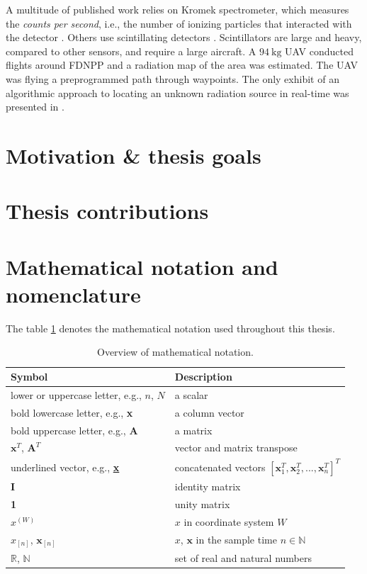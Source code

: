 \documentclass[a4paper,11pt,titlepage,twoside]{book}
\newcommand{\unit}[2]{$#1~\ensuremath{\mathrm{#2}}$}
\begin{document}
A multitude of published work relies on Kromek spectrometer, which measures the \textit{counts per second}, i.e., the number of ionizing particles that interacted with the detector \cite{han2013lowcost, macfarlane2014lightweight, martin20163d, martin2015use}.
Others use scintillating detectors \cite{sanada2015aerial, towler2012radiation}.
Scintillators are large and heavy, compared to other sensors, and require a large aircraft.
A \unit{94}{kg} UAV conducted flights around FDNPP \cite{sanada2015aerial} and a radiation map of the area was estimated.
The UAV was flying a preprogrammed path through waypoints.
The only exhibit of an algorithmic approach to locating an unknown radiation source in real-time was presented in \cite{towler2012radiation}.

\section{Motivation \& thesis goals}

\section{Thesis contributions}

\section{Mathematical notation and nomenclature}


The table \ref{tab:notation} denotes the mathematical notation used throughout this thesis.

\begin{table}[h]
  \centering
  \begin{tabular}{ll}
    \hline
    Symbol & Description \\
    \hline
    lower or uppercase letter, e.g., $n$, $N$ & a scalar \\
    bold lowercase letter, e.g., \textbf{x} & a column vector \\
    bold uppercase letter, e.g., \textbf{A} & a matrix \\
    $\textbf{x}^T$, $\textbf{A}^T$ & vector and matrix transpose \\
    underlined vector, e.g., \textbf{\underline{x}} & concatenated vectors $\left[\textbf{x}_1^T,\textbf{x}_2^T,...,\textbf{x}_n^T\right]^T$ \\
    \textbf{I} & identity matrix \\
    \textbf{1} & unity matrix \\
    $x^{(W)}$ & $x$ in coordinate system $W$ \\
    $x_{[n]}$, $\textbf{x}_{[n]}$ & $x$, $\textbf{x}$ in the sample time $n \in \mathbb{N}$ \\
    $\mathbb{R}$, $\mathbb{N}$ & set of real and natural numbers \\
    \hline
  \end{tabular}
  \caption{Overview of mathematical notation.}
  \label{tab:notation}
\end{table}
\end{document}
